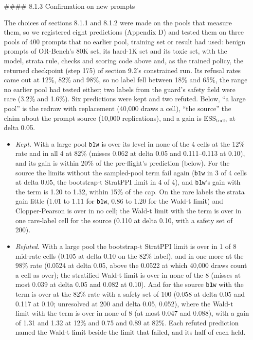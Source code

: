 \documentclass[11pt]{article}
\begin{document}
\#\#\#\# 8.1.3 Confirmation on new prompts


The choices of sections 8.1.1 and 8.1.2 were made on the pools that measure them, so we registered eight predictions (Appendix D) and tested them on three pools of 400 prompts that no earlier pool, training set or result had used: benign prompts of OR-Bench's 80K set, its hard-1K set and its toxic set, with the model, strata rule, checks and scoring code above and, as the trained policy, the returned checkpoint (step 175) of section 9.2's constrained run. Its refusal rates came out at 12\%, 82\% and 98\%, so no label fell between 18\% and 65\%, the range no earlier pool had tested either; two labels from the guard's safety field were rare (3.2\% and 1.6\%). Six predictions were kept and two refuted. Below, ``a large pool'' is the redraw with replacement (40,000 draws a cell), ``the source'' the claim about the prompt source (10,000 replications), and a gain is $\mathrm{ESS}_{\mathrm{truth}}$ at delta 0.05.


\begin{itemize}
\item \emph{Kept.} With a large pool \texttt{b1w} is over its level in none of the 4 cells at the 12\% rate and in all 4 at 82\% (misses 0.062 at delta 0.05 and 0.111--0.113 at 0.10), and its gain is within 20\% of the pre-flight's prediction (below). For the source the limits without the sampled-pool term fail again (\texttt{b1w} in 3 of 4 cells at delta 0.05, the bootstrap-t StratPPI limit in 4 of 4), and \texttt{b1w}'s gain with the term is 1.20 to 1.32, within 15\% of the cap. On the rare labels the strata gain little (1.01 to 1.11 for \texttt{b1w}, 0.86 to 1.20 for the Wald-t limit) and Clopper-Pearson is over in no cell; the Wald-t limit with the term is over in one rare-label cell for the source (0.110 at delta 0.10, with a safety set of 200).
\item \emph{Refuted.} With a large pool the bootstrap-t StratPPI limit is over in 1 of 8 mid-rate cells (0.105 at delta 0.10 on the 82\% label), and in one more at the 98\% rate (0.0524 at delta 0.05, above the 0.0522 at which 40,000 draws count a cell as over); the stratified Wald-t limit is over in none of the 8 (misses at most 0.039 at delta 0.05 and 0.082 at 0.10). And for the source \texttt{b1w} with the term is over at the 82\% rate with a safety set of 100 (0.058 at delta 0.05 and 0.117 at 0.10; unresolved at 200 and delta 0.05, 0.052), where the Wald-t limit with the term is over in none of 8 (at most 0.047 and 0.088), with a gain of 1.31 and 1.32 at 12\% and 0.75 and 0.89 at 82\%. Each refuted prediction named the Wald-t limit beside the limit that failed, and its half of each held.
\end{itemize}
\end{document}
